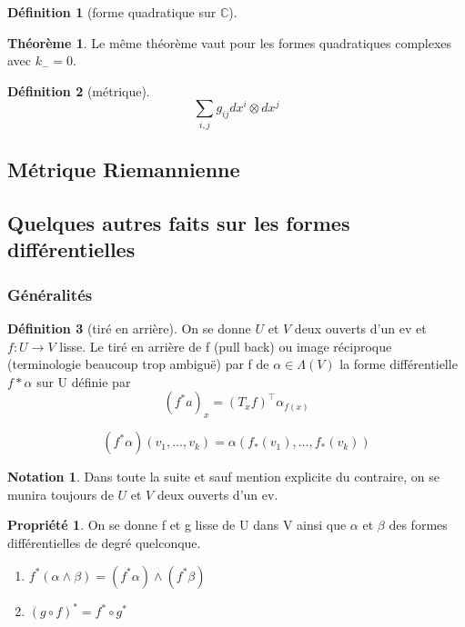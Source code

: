 \documentclass{article}
\newcommand{\C}{\mathbb{C}} %
\theoremstyle{definition} %
\newtheorem{defi}{Définition}
\newtheorem{thm}{Théorème}
\newtheorem{nota}{Notation}
\newtheorem{propri}{Propriété}
\newcommand{\1}{\mathbb{1}} %
\begin{document}
\begin{defi}[forme quadratique sur $\C$]
    
\end{defi}

\begin{thm}
    Le même théorème vaut pour les formes quadratiques complexes avec $k_-=0$.
\end{thm}

\begin{defi}[métrique]
$$\sum_{i,j} g_{ij}dx^i\otimes dx^j$$
\end{defi}

\subsection{Métrique Riemannienne}

\subsection{Quelques autres faits sur les formes différentielles}

\subsubsection{Généralités}

\begin{defi}[tiré en arrière]
On se donne $U$ et $V$ deux ouverts d'un ev et $f: U \to V$ lisse.
Le tiré en arrière de f (pull back) ou image réciproque (terminologie beaucoup trop ambiguë) par f de $\alpha \in \Lambda(V)$ la forme différentielle $f*\alpha$ sur U définie par
$$(f^*a)_x = (T_x f)^\intercal \alpha_{f(x)}$$

$$
(f^*\alpha)(v_1,\ldots,v_k)=\alpha(f_*(v_1),\ldots,f_*(v_k))
$$

\end{defi}

\begin{nota}
Dans toute la suite et sauf mention explicite du contraire, on se munira toujours de $U$ et $V$ deux ouverts d'un ev.
\end{nota}

\begin{propri}
On se donne f et g lisse de U dans V ainsi que $\alpha $ et $\beta$ des formes différentielles de degré quelconque.
\begin{enumerate}
\item $f^*(\alpha \wedge \beta) = (f^*\alpha) \wedge (f^*\beta)$
\item $(g \circ f)^*= f^* \circ g^*$
\end{enumerate} 
\end{propri}
\end{document}
